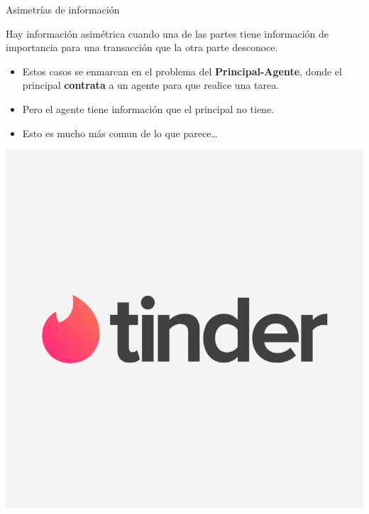 \documentclass{beamer}
\begin{document}
\begin{frame}{Asimetrías de información}
    \begin{boxA}
        \centering
        Hay información asimétrica
        cuando una de las partes tiene información de importancia para una
        transacción que la otra parte desconoce.
    \end{boxA}
    \begin{itemize}
        \item Estos casos se enmarcan en el problema del \textbf{Principal-Agente}, donde el principal \textbf{contrata} a un agente para que realice una tarea.
        \item Pero el agente tiene información que el principal no tiene.
        \item Esto es mucho más comun de lo que parece\dots
    \end{itemize}

    \centering
    \includegraphics[scale=0.1]{../Figures/Tinder_Info_Asim.png}
\end{frame}
\end{document}
